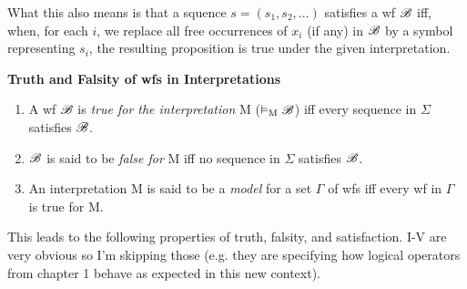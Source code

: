 What this also means is that a squence $s=(s_1, s_2, \dots)$ satisfies a wf $\mathscr{B}$ iff, when, for each $i$, we replace all free occurrences of $x_i$ (if any) in $\mathscr{B}$ by a symbol representing $s_i$, the resulting proposition is true under the given interpretation.

\textbf{Truth and Falsity of wfs in Interpretations}

\begin{enumerate}
    \item A wf $\mathscr{B}$ is \textit{true for the interpretation} M ($\vDash_\text{M} \mathscr{B}$) iff every sequence in $\Sigma$ satisfies $\mathscr{B}$.
    \item $\mathscr{B}$ is said to be \textit{false for} M iff no sequence in $\Sigma$ satisfies $\mathscr{B}$.
    \item An interpretation M is said to be a \textit{model} for a set $\Gamma$ of wfs iff every wf in $\Gamma$ is true for M.
\end{enumerate}

This leads to the following properties of truth, falsity, and satisfaction. I-V are very obvious so I'm skipping those (e.g. they are specifying how logical operators from chapter 1 behave as expected in this new context).

